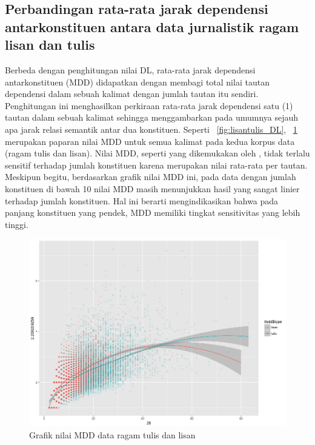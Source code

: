 \subsection{Perbandingan rata-rata jarak dependensi antarkonstituen antara data jurnalistik ragam lisan dan tulis}

Berbeda dengan penghitungan nilai DL, rata-rata jarak dependensi antarkonstituen (MDD) didapatkan dengan membagi total nilai tautan dependensi dalam sebuah kalimat dengan jumlah tautan itu sendiri. Penghitungan ini menghasilkan perkiraan rata-rata jarak dependensi satu (1) tautan dalam sebuah kalimat sehingga menggambarkan pada umumnya sejauh apa jarak relasi semantik antar dua konstituen. Seperti \pic~\ref{fig:lisantulis_DL}, \pic~\ref{fig:lisantulis_MDD} merupakan paparan nilai MDD untuk semua kalimat pada kedua korpus data (ragam tulis dan lisan). Nilai MDD, seperti yang dikemukakan oleh \cite{liu2017dependency}, tidak terlalu sensitif terhadap jumlah konstituen karena merupakan nilai rata-rata per tautan. Meskipun begitu, berdasarkan grafik nilai MDD ini, pada data dengan jumlah konstituen di bawah 10 nilai MDD masih menunjukkan hasil yang sangat linier terhadap jumlah konstituen. Hal ini berarti mengindikasikan bahwa pada panjang konstituen yang pendek, MDD memiliki tingkat sensitivitas yang lebih tinggi.

\begin{figure}
	\centering \includegraphics[width=1
	\textwidth] {pics/lisantulis_MDD.png} 
	\caption{Grafik nilai MDD data ragam tulis dan lisan} 
\label{fig:lisantulis_MDD} 
\end{figure}


